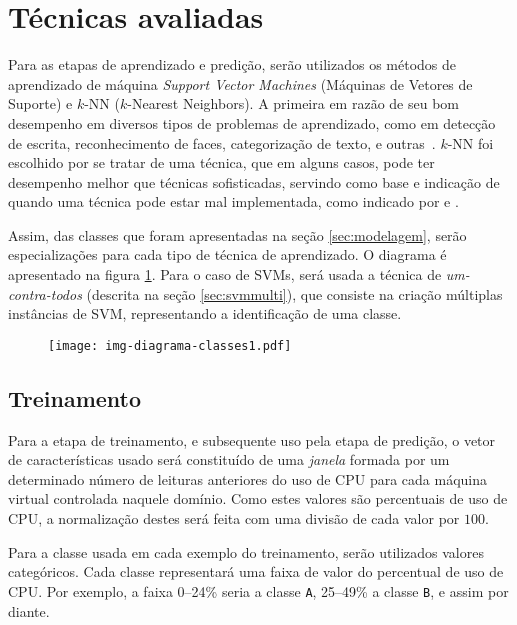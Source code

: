 \section{Técnicas avaliadas}

Para as etapas de aprendizado e predição, serão utilizados os métodos de
aprendizado de máquina \emph{Support Vector Machines} (Máquinas de Vetores
de Suporte) e $k$-NN ($k$-Nearest Neighbors). A primeira em razão de seu
bom desempenho em diversos tipos de problemas de aprendizado, como em
detecção de escrita, reconhecimento de faces, categorização de texto, e
outras~\cite{bennett2000support}. $k$-NN foi escolhido por se tratar de uma
técnica, que em alguns casos, pode ter desempenho melhor que técnicas
sofisticadas, servindo como base e indicação de quando uma técnica pode
estar mal implementada, como indicado por  e
.

Assim, das classes que foram apresentadas na seção \ref{sec:modelagem},
serão especializações para cada tipo de técnica de aprendizado. O diagrama
é apresentado na figura \ref{fig:diagramaclasses1}. Para o caso de SVMs,
será usada a técnica de \emph{um-contra-todos} (descrita na seção
\ref{sec:svmmulti}), que consiste na criação múltiplas instâncias de SVM,
representando a identificação de uma classe.

\begin{figure}[htp]
\centering
\texttt{[image: img-diagrama-classes1.pdf]}
\label{fig:diagramaclasses1}
\end{figure}

\subsection{Treinamento}

Para a etapa de treinamento, e subsequente uso pela etapa de predição, o
vetor de características usado será constituído de uma \emph{janela}
formada por um determinado número de leituras anteriores do uso de CPU para
cada máquina virtual controlada naquele domínio. Como estes valores são
percentuais de uso de CPU, a normalização destes será feita com uma divisão
de cada valor por $100$.

Para a classe usada em cada exemplo do treinamento, serão utilizados
valores categóricos. Cada classe representará uma faixa de valor do
percentual de uso de CPU. Por exemplo, a faixa 0--24\% seria a classe
\texttt{A}, 25--49\% a classe \texttt{B}, e assim por diante.

